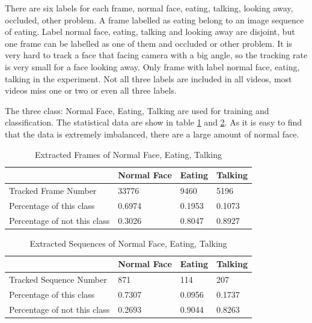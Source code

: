 \newline
There are six labels for each frame, normal face, eating, talking, looking away, occluded, other problem. A frame labelled as eating belong to an image sequence of eating. Label normal face, eating, talking and looking away are disjoint, but one frame can be labelled as one of them and occluded or other problem. It is very hard to track a face that facing camera with a big angle, so the tracking rate is very small for a face looking away. Only frame with label normal face, eating, talking in the experiment. Not all three labels are included in all videos, most videos miss one or two or even all three labels.

The three class: Normal Face, Eating, Talking are used for training and classification. The statistical data are show in table \ref{tab:UFD} and \ref{tab:USD}. As it is easy to find that the data is extremely imbalanced, there are a large amount of normal face.
\begin{table}[ht]
\centering
\begin{tabular}{l|l|l|l|}
\cline{2-4}
                                                   & Normal Face & Eating & Talking \\ \hline
\multicolumn{1}{|l|}{Tracked Frame Number}         & 33776       & 9460   & 5196    \\ \hline
\multicolumn{1}{|l|}{Percentage of this class}     & 0.6974      & 0.1953 & 0.1073  \\ \hline
\multicolumn{1}{|l|}{Percentage of not this class} & 0.3026      & 0.8047 & 0.8927  \\ \hline
\end{tabular}
\caption{Extracted Frames of Normal Face, Eating, Talking}
\label{tab:UFD}
\end{table}
\begin{table}[ht]
\centering
\begin{tabular}{l|l|l|l|}
\cline{2-4}
                                                   & Normal Face & Eating & Talking \\ \hline
\multicolumn{1}{|l|}{Tracked Sequence Number}      & 871         & 114    & 207     \\ \hline
\multicolumn{1}{|l|}{Percentage of this class}     & 0.7307      & 0.0956 & 0.1737  \\ \hline
\multicolumn{1}{|l|}{Percentage of not this class} & 0.2693      & 0.9044 & 0.8263  \\ \hline
\end{tabular}
\caption{Extracted Sequences of Normal Face, Eating, Talking}
\label{tab:USD}
\end{table}

